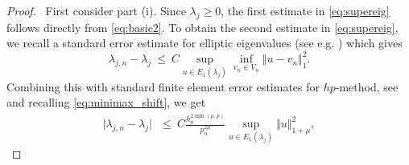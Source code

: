 \documentclass[preprint,12pt]{elsarticle}
\begin{document}
\begin{proof}\
First consider part (i). 
Since $\lambda_j \geq  0$, the first estimate in 
\eqref{eq:supereig} follows directly from \eqref{eq:basic2}.
 To obtain the second estimate in \eqref{eq:supereig},  
we recall a  standard error  estimate for elliptic eigenvalues   
(see e.g.  \cite[(1.1)]{BaOs:89}) which gives  
$$ \lambda_{j,n} - \lambda_j \ \leq \  C \sup_{u \in
  E_1(\lambda_j)} \inf_{v_n \in V_n} \Vert u - v_n \Vert_1^2. $$
Combining this with standard finite element error
estimates for $hp$-method, see \cite[Theorem~4.72]{schwab} and 
recalling \eqref{eq:minimax_shift}, we get  
\begin{eqnarray}
\vert \lambda_{j,n} - \lambda_j \vert \  \  
\ \leq \ C \frac{h_n^{2\min(\mu,p)} }{p_n^{2\mu}} \sup_{u \in
  E_1(\lambda_j)} \Vert u \Vert_{1+\mu}^2 ,  \label{eq:second_est} \end{eqnarray}


\end{proof}
\end{document}
